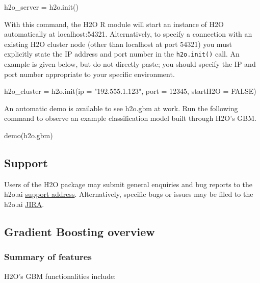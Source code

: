 \documentclass[11pt]{article}
\begin{document}
\begin{spverbatim}
h2o_server = h2o.init()

\end{spverbatim}
\noindent
With this command, the H2O R module will start an instance of H2O automatically at localhost:54321. Alternatively,  to specify a connection with an existing H2O cluster node (other than localhost at port 54321) you must explicitly state the IP address and port number in the \texttt{h2o.init()} call. An example is given below, but do not directly paste; you should specify the IP and port number appropriate to your specific environment.

\begin{spverbatim}
h2o_cluster = h2o.init(ip = "192.555.1.123", port = 12345, startH2O = FALSE)

\end{spverbatim}
\noindent
An automatic demo is available to see h2o.gbm at work. Run the following command to observe an example classification model built through H2O's GBM.

\begin{spverbatim}
demo(h2o.gbm)
\end{spverbatim}

\subsection{Support} \label{1.2}

Users of the H2O package may submit general enquiries and bug reports to the h2o.ai \href{h2ostream@googlegroups.com}{support address}. Alternatively, specific bugs or issues may be filed to the h2o.ai \href{https://0xdata.atlassian.net/secure/Dashboard.jspa}{JIRA}.

\subsection{Gradient Boosting overview} \label{1.3}

\subsubsection{Summary of features} \label{2.1}
H2O's GBM functionalities include:
\end{document}
